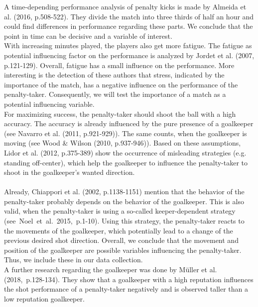 \documentclass[12pt,dvipsnames]{article}%
\begin{document}
A time-depending performance analysis of penalty kicks is made by Almeida et al. (2016, p.508-522). They divide the match into three thirds of half an hour and could find differences in performance regarding these parts. We conclude that the point in time can be decisive and a variable of interest. \\
With increasing minutes played, the players also get more fatigue. The fatigue as potential influencing factor on the performance is analyzed by Jordet et al. (2007, p.121-129). Overall, fatigue has a small influence on the performance. More interesting is the detection of these authors that stress, indicated by the importance of the match, has a negative influence on the performance of the penalty-taker. Consequently, we will test the importance of a match as a potential influencing variable. \\
%
For maximizing success, the penalty-taker should shoot the ball with a high accuracy. The accuracy is already influenced by the pure presence of a goalkeeper (see Navarro et al. (2011, p.921-929)). The same counts, when the goalkeeper is moving (see Wood \& Wilson (2010, p.937-946)). Based on these assumptions, Lidor et al. (2012, p.375-389) show the occurrence of misleading strategies (e.g. standing off-center), which help the goalkeeper to influence the penalty-taker to shoot in the goalkeeper's wanted direction. \\
\\ 
Already, Chiappori et al. (2002, p.1138-1151) mention that the behavior of the penalty-taker probably depends on the behavior of the goalkeeper. This is also valid, when the penalty-taker is using a so-called keeper-dependent strategy \mbox{(see Noel et al. 2015, p.1-10)}. Using this strategy, the penalty-taker reacts to the movements of the goalkeeper, which potentially lead to a change of the previous desired shot direction. Overall, we conclude that the movement and position of the goalkeeper are possible variables influencing the penalty-taker. Thus, we include these in our data collection.\\
A further research regarding the goalkeeper was done by M\"uller et al. \mbox{(2018, p.128-134).} They show that a goalkeeper with a high reputation influences the shot performance of a penalty-taker negatively and is observed taller than a low reputation goalkeeper.
\end{document}
